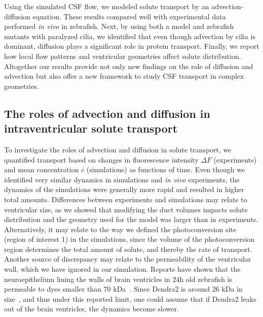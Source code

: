 \documentclass[fleqn]{wlscirep}
\newcommand{\cbar}{\overline{c}}
\begin{document}
Using the simulated CSF flow, we modeled solute transport by an advection-diffusion equation.
These results compared well with experimental data performed \emph{in vivo} in zebrafish.
Next, by using both a model and zebrafish mutants with paralyzed cilia,
we identified that even though advection by cilia is dominant,
diffusion plays a significant role  in protein transport. Finally, we report how local
flow patterns and ventricular geometries affect solute distribution.
Altogether our results provide not only new findings on the role of
diffusion and advection but also offer a new framework to study CSF transport in complex geometries.

\subsection*{The roles of advection and diffusion in intraventricular solute transport}
To investigate the roles of advection and diffusion in solute transport, we quantified transport
based on changes in fluorescence intensity $\Delta F$ (experiments) and
mean concentration $\cbar$ (simulations) as functions of time.
Even though we identified very similar dynamics in simulations and
\emph{in vivo} experiments, the dynamics of the simulations were generally
more rapid and resulted in higher total amounts.
Differences between experiments and simulations may relate to
ventricular size, as we showed that modifying the duct volumes impacts
solute distribution and the geometry used for the model was larger than in experiments.
Alternatively, it may relate to the way we defined the photoconversion site (region of interest 1)
in the simulations, since the volume of the photoconversion region determines
the total amount of solute, and thereby the rate of transport. Another source
of discrepancy may relate to the permeability of the ventricular wall,
which we have ignored in our simulation. Reports have shown that the
neuroepithelium lining the walls of brain ventricles in 24h old zebrafish
is permeable to dyes smaller than 70 kDa~\cite{Chang2012AnNeuroepithelium}.
Since Dendra2 is around 26 kDa in size~\cite{Gurskaya2006EngineeringLight},
and thus under this reported limit, one could assume that if Dendra2
leaks out of the brain ventricles, the dynamics become slower.
\end{document}
